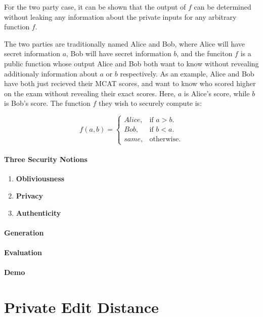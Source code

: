 For the two party case, it can be shown that the output of $f$ can be determined without leaking any information about the private inputs for any arbitrary function $f$.

The two parties are traditionally named Alice and Bob, where Alice will have secret information $a$, Bob will have secret information $b$, and the funciton $f$ is a public function whose output Alice and Bob both want to know without revealing additionaly information about $a$ or $b$ respectively. As an example, Alice and Bob have both just recieved their MCAT scores, and want to know who scored higher on the exam without revealing their exact scores. Here, $a$ is Alice's score, while $b$ is Bob's score. The function $f$ they wish to securely compute is:  

\begin{equation}
f(a,b)= \begin{cases}
Alice, & \text{if $a > b$}.\\
Bob, & \text{if $b < a$}.\\
same, & \text{otherwise}.
\end{cases}
\end{equation}

\paragraph{Three Security Notions}

\begin{enumerate}
\item \textbf{Obliviousness}
\item \textbf{Privacy}
\item \textbf{Authenticity}
\end{enumerate}

\paragraph{Generation}

\paragraph{Evaluation}

\paragraph{Demo}

\section{Private Edit Distance}


